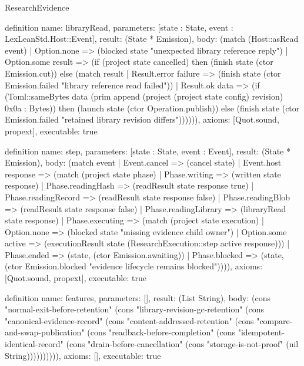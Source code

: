\begin{lexlean}{ResearchEvidence}
\begin{semanticmodule}
definition{
 name: libraryRead,
 parameters: [state : State, event : LexLeanStd.Host::Event],
 result: (State * Emission),
 body: (match (Host::asRead event) | Option.none => (blocked state "unexpected library reference reply") | Option.some result => (if (project state cancelled) then (finish state (ctor Emission.cut)) else (match result | Result.error failure => (finish state (ctor Emission.failed "library reference read failed")) | Result.ok data => (if (Toml::sameBytes data (prim append (project (project state config) revision) 0x0a : Bytes)) then (launch state (ctor Operation.publish)) else (finish state (ctor Emission.failed "retained library revision differs")))))),
 axioms: [Quot.sound, propext],
 executable: true
}

definition{
 name: step,
 parameters: [state : State, event : Event],
 result: (State * Emission),
 body: (match event | Event.cancel => (cancel state) | Event.host response => (match (project state phase) | Phase.writing => (written state response) | Phase.readingHash => (readResult state response true) | Phase.readingRecord => (readResult state response false) | Phase.readingBlob => (readResult state response false) | Phase.readingLibrary => (libraryRead state response) | Phase.executing => (match (project state execution) | Option.none => (blocked state "missing evidence child owner") | Option.some active => (executionResult state (ResearchExecution::step active response))) | Phase.ended => (state, (ctor Emission.awaiting)) | Phase.blocked => (state, (ctor Emission.blocked "evidence lifecycle remains blocked")))),
 axioms: [Quot.sound, propext],
 executable: true
}

definition{
 name: features,
 parameters: [],
 result: (List String),
 body: (cons "normal-exit-before-retention" (cons "library-revision-gc-retention" (cons "canonical-evidence-record" (cons "content-addressed-retention" (cons "compare-and-swap-publication" (cons "readback-before-completion" (cons "idempotent-identical-record" (cons "drain-before-cancellation" (cons "storage-is-not-proof" (nil String)))))))))),
 axioms: [],
 executable: true
}

\end{semanticmodule}
\end{lexlean}
